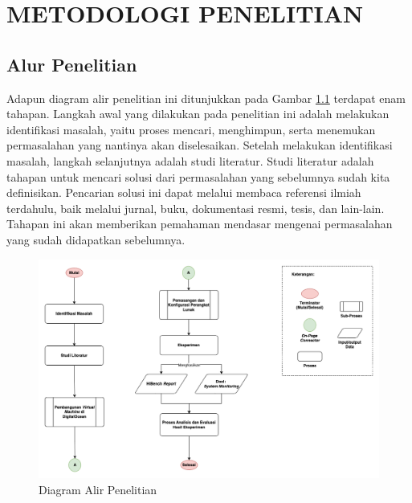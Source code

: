 \chapter{METODOLOGI PENELITIAN}
%


\section{Alur Penelitian}
Adapun diagram alir penelitian ini ditunjukkan pada Gambar \ref{fig:diagram alir} terdapat enam tahapan. Langkah awal yang dilakukan pada penelitian ini adalah melakukan identifikasi masalah, yaitu proses mencari, menghimpun, serta menemukan permasalahan yang nantinya akan diselesaikan. Setelah melakukan identifikasi masalah, langkah selanjutnya adalah studi literatur. Studi literatur adalah tahapan untuk mencari solusi dari permasalahan yang sebelumnya sudah kita definisikan. Pencarian solusi ini dapat melalui membaca referensi ilmiah terdahulu, baik melalui jurnal, buku, dokumentasi resmi, tesis, dan lain-lain. Tahapan ini akan memberikan pemahaman mendasar mengenai permasalahan yang sudah didapatkan sebelumnya. 

\begin{figure}[h!]
    \centering
    \includegraphics[width=1\textwidth]{figures/ch03/Diagram Tugas Akhir.png}
    \caption{Diagram Alir Penelitian}
    \label{fig:diagram alir}
\end{figure}

